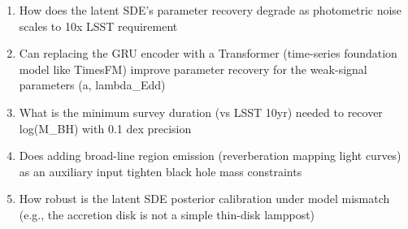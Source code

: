 \documentclass[11pt]{article}
\begin{document}
\begin{enumerate}[leftmargin=1.6em,itemsep=0.2em,topsep=0.2em,label=Q\arabic*.]
\item How does the latent SDE's parameter recovery degrade as photometric noise scales to 10x LSST requirement
\item Can replacing the GRU encoder with a Transformer (time-series foundation model like TimesFM) improve parameter recovery for the weak-signal parameters (a, lambda\_Edd)
\item What is the minimum survey duration (vs LSST 10yr) needed to recover log(M\_BH) with 0.1 dex precision
\item Does adding broad-line region emission (reverberation mapping light curves) as an auxiliary input tighten black hole mass constraints
\item How robust is the latent SDE posterior calibration under model mismatch (e.g., the accretion disk is not a simple thin-disk lamppost)
\end{enumerate}
\end{document}
